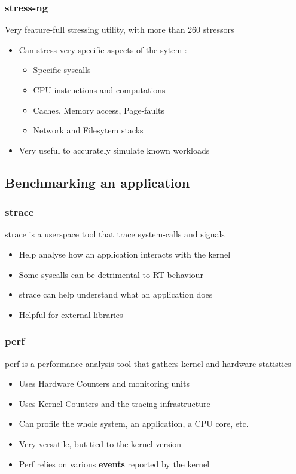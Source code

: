 \begin{frame}
	\frametitle{stress-ng}
	Very feature-full stressing utility, with more than 260 stressors
	\begin{itemize}
		\item Can stress very specific aspects of the sytem :
			\begin{itemize}
				\item Specific syscalls
				\item CPU instructions and computations
				\item Caches, Memory access, Page-faults
				\item Network and Filesytem stacks
			\end{itemize}
		\item Very useful to accurately simulate known workloads
	\end{itemize}
\end{frame}

\subsection{Benchmarking an application}
\begin{frame}
	\frametitle{strace}
	strace is a userspace tool that trace system-calls and signals
	\begin{itemize}
		\item Help analyse how an application interacts with the kernel
		\item Some syscalls can be detrimental to RT behaviour
		\item strace can help understand what an application does
		\item Helpful for external libraries
	\end{itemize}
\end{frame}

\begin{frame}
	\frametitle{perf}
	perf is a performance analysis tool that gathers kernel and hardware statistics
	\begin{itemize}
		\item Uses Hardware Counters and monitoring units
		\item Uses Kernel Counters and the tracing infrastructure
		\item Can profile the whole system, an application, a CPU core, etc.
		\item Very versatile, but tied to the kernel version
		\item Perf relies on various \textbf{events} reported by the kernel
	\end{itemize}
\end{frame}

